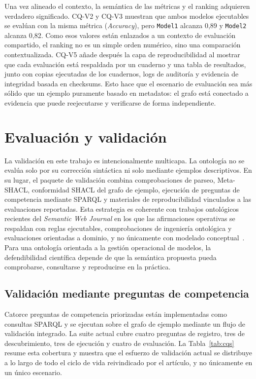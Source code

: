\documentclass[11pt,a4paper]{article}
\newcommand{\cq}[1]{\textsf{#1}}
\begin{document}
Una vez alineado el contexto, la semántica de las métricas y el ranking adquieren verdadero significado. \cq{CQ-V2} y \cq{CQ-V3} muestran que ambos modelos ejecutables se evalúan con la misma métrica (\emph{Accuracy}), pero \texttt{Model1} alcanza 0,89 y \texttt{Model2} alcanza 0,82. Como esos valores están enlazados a un contexto de evaluación compartido, el ranking no es un simple orden numérico, sino una comparación contextualizada. \cq{CQ-V5} añade después la capa de reproducibilidad al mostrar que cada evaluación está respaldada por un cuaderno y una tabla de resultados, junto con copias ejecutadas de los cuadernos, logs de auditoría y evidencia de integridad basada en checksums. Esto hace que el escenario de evaluación sea más sólido que un ejemplo puramente basado en metadatos: el grafo está conectado a evidencia que puede reejecutarse y verificarse de forma independiente.

\section{Evaluación y validación}\label{sec:eval}

La validación en este trabajo es intencionalmente multicapa. La ontología no se evalúa solo por su corrección sintáctica ni solo mediante ejemplos descriptivos. En su lugar, el paquete de validación combina comprobaciones de parseo, Meta-SHACL, conformidad SHACL del grafo de ejemplo, ejecución de preguntas de competencia mediante SPARQL y materiales de reproducibilidad vinculados a las evaluaciones reportadas. Esta estrategia es coherente con trabajos ontológicos recientes del \emph{Semantic Web Journal} en los que las afirmaciones operativas se respaldan con reglas ejecutables, comprobaciones de ingeniería ontológica y evaluaciones orientadas a dominio, y no únicamente con modelado conceptual~\cite{kurteva,woods,bareedu24,ferranti,robaldo}. Para una ontología orientada a la gestión operacional de modelos, la defendibilidad científica depende de que la semántica propuesta pueda comprobarse, consultarse y reproducirse en la práctica.

\subsection{Validación mediante preguntas de competencia}

Catorce preguntas de competencia priorizadas están implementadas como consultas SPARQL y se ejecutan sobre el grafo de ejemplo mediante un flujo de validación integrado. La suite actual cubre cuatro preguntas de registro, tres de descubrimiento, tres de ejecución y cuatro de evaluación. La Tabla~\ref{tab:cqs} resume esta cobertura y muestra que el esfuerzo de validación actual se distribuye a lo largo de todo el ciclo de vida reivindicado por el artículo, y no únicamente en un único escenario.
\end{document}
